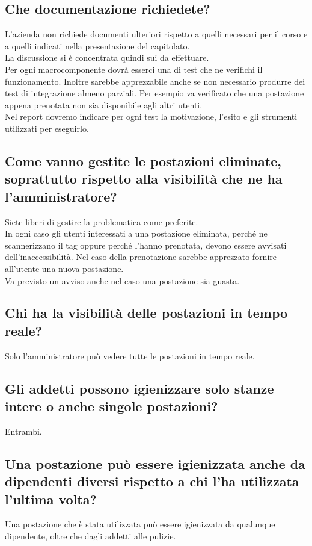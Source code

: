 \subsection*{Che documentazione richiedete?}
L'azienda non richiede documenti ulteriori rispetto a quelli necessari per il corso e a quelli indicati nella presentazione del capitolato.\\
La discussione si è concentrata quindi sui  da effettuare.\\
Per ogni macrocomponente dovrà esserci una  di test che ne verifichi il funzionamento. Inoltre sarebbe apprezzabile anche se non necessario produrre dei test di integrazione almeno parziali. Per esempio va verificato che una postazione appena prenotata non sia disponibile agli altri utenti.\\
Nel report dovremo indicare per ogni test la motivazione, l'esito e gli strumenti utilizzati per eseguirlo.

\subsection*{Come vanno gestite le postazioni eliminate, soprattutto rispetto alla visibilità che ne ha l'amministratore?}
Siete liberi di gestire la problematica come preferite.\\
In ogni caso gli utenti interessati a una postazione eliminata, perché ne scannerizzano il tag  oppure perché l'hanno prenotata, devono essere avvisati dell'inaccessibilità. Nel caso della prenotazione sarebbe apprezzato fornire all'utente una nuova postazione.\\
Va previsto un avviso anche nel caso una postazione sia guasta.

\subsection*{Chi ha la visibilità delle postazioni in tempo reale?}
Solo l'amministratore può vedere tutte le postazioni in tempo reale.

\subsection*{Gli addetti possono igienizzare solo stanze intere o anche singole postazioni?}
Entrambi.

\subsection*{Una postazione può essere igienizzata anche da dipendenti diversi rispetto a chi l'ha utilizzata l'ultima volta?}
Una postazione che è stata utilizzata può essere igienizzata da qualunque dipendente, oltre che dagli addetti alle pulizie.

